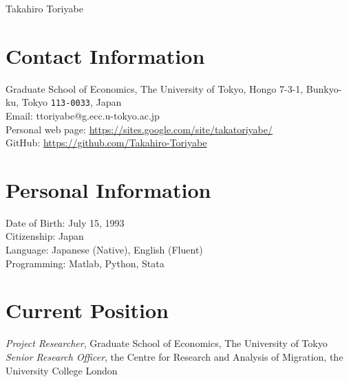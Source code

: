 \documentclass[11pt, a4paper]{article} %
\begin{document}

{\LARGE Takahiro Toriyabe}\\[1cm] %

\section*{Contact Information}
Graduate School of Economics, The University of Tokyo, Hongo 7-3-1, Bunkyo-ku, Tokyo \texttt{113-0033}, Japan\\
Email: ttoriyabe@g.ecc.u-tokyo.ac.jp\\ %
Personal web page: \url{https://sites.google.com/site/takatoriyabe/} \\ %
GitHub: \url{https://github.com/Takahiro-Toriyabe}



\section*{Personal Information}

Date of Birth: July 15, 1993\\ %
Citizenship: Japan\\ %
Language: Japanese (Native), English (Fluent) \\
Programming: Matlab, Python, Stata


\section*{Current Position}

\emph{Project Researcher}, Graduate School of Economics, The University of Tokyo \\
\emph{Senior Research Officer}, the Centre for Research and Analysis of Migration, the University College London
\end{document}
